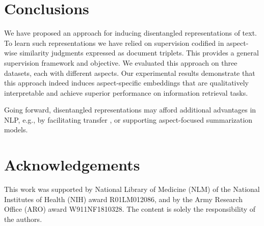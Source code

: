 \documentclass[11pt,a4paper]{article}
\begin{document}

\section{Conclusions}

We have proposed an approach for inducing disentangled representations of text. To learn such representations we have relied on supervision codified in aspect-wise similarity judgments expressed as document triplets. This provides a general supervision framework and objective. We evaluated this approach on three datasets, each with different aspects. Our experimental results demonstrate that this approach indeed induces aspect-specific embeddings that are qualitatively interpretable and achieve superior performance on information retrieval tasks. 

Going forward, disentangled representations may afford additional advantages in NLP, e.g., by facilitating transfer \cite{zhang2017aspect}, or supporting aspect-focused summarization models. 


\section{Acknowledgements}
This work was supported by National Library of Medicine (NLM) of the National Institutes of Health (NIH) award R01LM012086, and by the Army Research Office (ARO) award W911NF1810328. The content is solely the responsibility of the authors.




\end{document}
